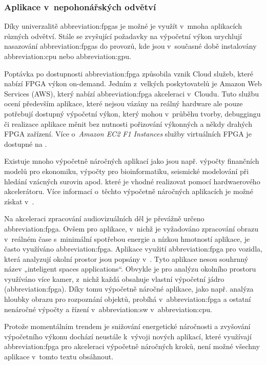 \documentclass[a4paper, twoside, 11pt]{article}
\begin{document}
			\subsubsection{Aplikace v~nepohonářských odvětví}
				Díky univerzalitě \gls{abbreviation:fpgas} je možné je využít v~mnoha aplikacích různých odvětví. Stále se zvyšující požadavky na výpočetní výkon urychlují nasazování \gls{abbreviation:fpgas} do provozů, kde jsou v~současné době instalovány \gls{abbreviation:cpu} nebo \gls{abbreviation:gpu}.\par
				Poptávka po dostupnosti \gls{abbreviation:fpga} způsobila vznik Cloud služeb, které nabízí FPGA výkon on-demand. Jedním z~velkých poskytovatelů je Amazon Web Services (AWS), který nabízí \gls{abbreviation:fpga} akceleraci v~Cloudu. Tuto službu ocení především aplikace, které nejsou vázány na reálný hardware ale pouze potřebují dostupný výpočetní výkon, který mohou v~průběhu tvorby, debuggingu či realizace aplikace měnit bez nutnosti pořizování výkonných a někdy drahých FPGA zařízení. Více o~\textit{Amazon EC2 F1 Instances} služby virtuálních FPGA je dostupné na \cite{amazon-ec2-f1}.\par
				Existuje mnoho výpočetně náročných aplikací jako jsou např. výpočty finančních modelů pro ekonomiku, výpočty pro bioinformatiku, seismické modelování při hledání vzácných surovin apod. které je vhodné realizovat pomocí hardwaerového akcelerátoru. Více informací o~těchto výpočetně náročných aplikacích je možné získat v~\cite{wim-high-performance-computing-using-fpgas}.\par
				Na akceleraci zpracování audiovizuálních děl je převážně určeno \gls{abbreviation:fpga}. Ovšem pro aplikace, v~nichž je vyžadováno zpracování obrazu v~reálném čase s~minimální spotřebou energie a nízkou hmotností aplikace, je často využíváno \gls{abbreviation:fpga}. Aplikace využití \gls{abbreviation:fpga} pro vozidla, která analyzují okolní prostor jsou popsány v~\cite{andina-advanced-features-and-industrial-applications-of-fpga}. Tyto aplikace nesou souhrnný název „inteligent spaces applications“. Obvykle je pro analýzu okolního prostoru využíváno více kamer, z~nichž každá obsahuje vlastní výpočetní jádro (\gls{abbreviation:fpga}). Díky tomu výpočetně náročné aplikace, jako např. analýza hloubky obrazu pro rozpoznání objektů, probíhá v~\gls{abbreviation:fpga} a ostatní nenáročné výpočty a řízení v~\gls{abbreviation:sw} v~\gls{abbreviation:cpu}. \cite{andina-advanced-features-and-industrial-applications-of-fpga}\par
				Protože momentálním trendem je snižování energetické náročnosti a zvyšování výpočetního výkonu dochází neustále k~vývoji nových aplikací, které využívají \gls{abbreviation:fpga} pro akceleraci výpočetně náročných kroků, není možné všechny aplikace v~tomto textu obsáhnout.
\end{document}
